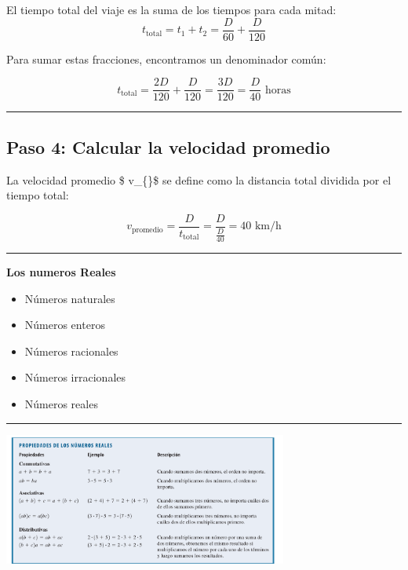 \documentclass[
  letterpaper,
  DIV=11,
  numbers=noendperiod]{scrartcl}
\providecommand{\tightlist}{%
  \setlength{\itemsep}{0pt}\setlength{\parskip}{0pt}}\usepackage{longtable,booktabs,array}
\begin{document}
El tiempo total del viaje es la suma de los tiempos para cada mitad:
\[t_{\text{total}} = t_1 + t_2 = \frac{D}{60} + \frac{D}{120}\]

Para sumar estas fracciones, encontramos un denominador común:

\[t_{\text{total}} = \frac{2D}{120} + \frac{D}{120} = \frac{3D}{120} = \frac{D}{40} \text{ horas}\]

\begin{center}\rule{0.5\linewidth}{0.5pt}\end{center}

\subsection{Paso 4: Calcular la velocidad
promedio}\label{paso-4-calcular-la-velocidad-promedio}

La velocidad promedio \$ v\_\{\}\$ se define como la
distancia total dividida por el tiempo total:

\[v_{\text{promedio}} = \frac{D}{t_{\text{total}}} = \frac{D}{\frac{D}{40}} = 40 \text{ km/h}\]

\begin{center}\rule{0.5\linewidth}{0.5pt}\end{center}

\textbf{Los numeros Reales}

\begin{itemize}
\tightlist
\item
  Números naturales
\item
  Números enteros
\item
  Números racionales
\item
  Números irracionales
\item
  Números reales
\end{itemize}

\begin{center}\rule{0.5\linewidth}{0.5pt}\end{center}

\includegraphics[width=0.7\textwidth,height=\textheight]{propiedades.png}
\end{document}
